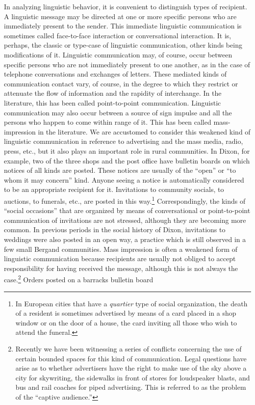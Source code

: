 \documentclass[openany,nobib]{tufte-book}
\begin{document}
In analyzing linguistic behavior, it is convenient to distinguish types
of recipient. A linguistic message may be directed at one or more
specific persons who are immediately present to the sender. This
immediate linguistic communication is sometimes called face-to-face
interaction or conversational interaction. It is, perhaps, the classic
or type-case of linguistic communication, other kinds being
modifications of it. Linguistic communication may, of course, occur
between specific persons who are not immediately present to one another,
as in the case of telephone conversations and exchanges of letters.
These mediated kinds of communication contact vary, of course, in the
degree to which they restrict or attenuate the flow of information and
the rapidity of interchange. In the literature, this has been called
point-to-point communication. Linguistic communication may also occur
between a source of sign impulse and all the persons who happen to come
within range of it. This has been called mass-impression in the
literature. We are accustomed to consider this weakened kind of
linguistic communication in reference to advertising and the mass media,
radio, press, etc., but it also plays an important role in rural
communities. In Dixon, for example, two of the three shops and the post
office have bulletin boards on which notices of all kinds are posted.
These notices are usually of the ``open'' or ``to whom it may concern''
kind. Anyone seeing a notice is automatically considered to be an
appropriate recipient for it. Invitations to community socials, to
auctions, to funerals, etc., are posted in this way.\footnote{In
  European cities that have a \emph{quartier} type of social
  organization, the death of a resident is sometimes advertised by means
  of a card placed in a shop window or on the door of a house, the card
  inviting all those who wish to attend the funeral.} Correspondingly,
the kinds of ``social occasions'' that are organized by means of
conversational or point-to-point communication of invitations are not
stressed, although they are becoming more common. In previous periods in
the social history of Dixon, invitations to weddings were also posted in
an open way, a practice which is still observed in a few small Bergand
communities. Mass impression is often a weakened form of linguistic
communication because recipients are usually not obliged to accept
responsibility for having received the message, although this is not
always the case.\footnote{Recently we have been witnessing a series of
  conflicts concerning the use of certain bounded spaces for this kind
  of communication. Legal questions have arise as to whether advertisers
  have the right to make use of the sky above a city for skywriting, the
  sidewalks in front of stores for loudspeaker blasts, and bus and rail
  coaches for piped advertising. This is referred to as the problem of
  the ``captive audience.''} Orders posted on a barracks bulletin board
\end{document}
